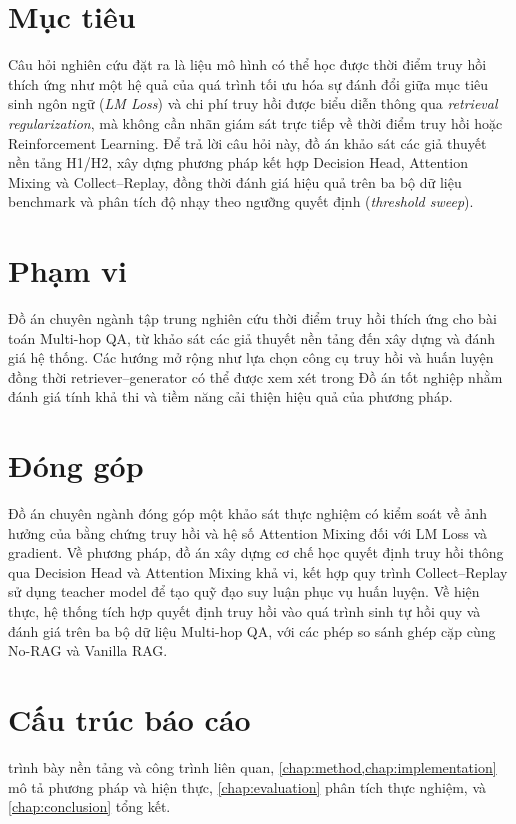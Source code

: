\section{Mục tiêu}
Câu hỏi nghiên cứu đặt ra là liệu mô hình có thể học được thời điểm truy hồi thích ứng như một hệ quả của quá trình tối ưu hóa sự đánh đổi giữa mục tiêu sinh ngôn ngữ (\emph{LM Loss}) và chi phí truy hồi được biểu diễn thông qua \emph{retrieval regularization}, mà không cần nhãn giám sát trực tiếp về thời điểm truy hồi hoặc Reinforcement Learning. Để trả lời câu hỏi này, đồ án khảo sát các giả thuyết nền tảng H1/H2, xây dựng phương pháp kết hợp Decision Head, Attention Mixing và Collect–Replay, đồng thời đánh giá hiệu quả trên ba bộ dữ liệu benchmark và phân tích độ nhạy theo ngưỡng quyết định (\emph{threshold sweep}).

\section{Phạm vi}
Đồ án chuyên ngành tập trung nghiên cứu thời điểm truy hồi thích ứng cho bài toán Multi-hop QA, từ khảo sát các giả thuyết nền tảng đến xây dựng và đánh giá hệ thống. Các hướng mở rộng như lựa chọn công cụ truy hồi và huấn luyện đồng thời retriever–generator có thể được xem xét trong Đồ án tốt nghiệp nhằm đánh giá tính khả thi và tiềm năng cải thiện hiệu quả của phương pháp.

\section{Đóng góp}
Đồ án chuyên ngành đóng góp một khảo sát thực nghiệm có kiểm soát về ảnh hưởng của bằng chứng truy hồi và hệ số Attention Mixing đối với LM Loss và gradient. Về phương pháp, đồ án xây dựng cơ chế học quyết định truy hồi thông qua Decision Head và Attention Mixing khả vi, kết hợp quy trình Collect–Replay sử dụng teacher model để tạo quỹ đạo suy luận phục vụ huấn luyện. Về hiện thực, hệ thống tích hợp quyết định truy hồi vào quá trình sinh tự hồi quy và đánh giá trên ba bộ dữ liệu Multi-hop QA, với các phép so sánh ghép cặp cùng No-RAG và Vanilla RAG.

\section{Cấu trúc báo cáo}
 trình bày nền tảng và công trình liên quan, \cref{chap:method,chap:implementation} mô tả phương pháp và hiện thực, \cref{chap:evaluation} phân tích thực nghiệm, và \cref{chap:conclusion} tổng kết.
